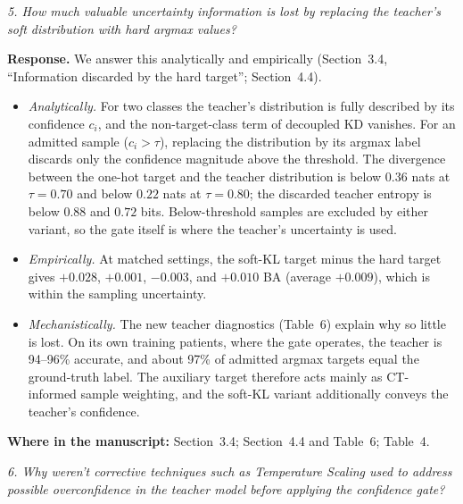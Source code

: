 \documentclass[11pt]{article}
\newenvironment{rcomment}{\par\noindent\begin{minipage}{\linewidth}\itshape\color{black!75}}{\end{minipage}\par}
\newcommand{\where}[1]{\par\noindent\textbf{Where in the manuscript:} #1\par}
\begin{document}
\begin{rcomment}
5. How much valuable uncertainty information is lost by replacing the teacher's soft distribution with hard argmax values?
\end{rcomment}

\textbf{Response.} We answer this analytically and empirically (Section~3.4, ``Information discarded by the hard target''; Section~4.4).
\begin{itemize}[leftmargin=1.4em]
  \item \emph{Analytically.} For two classes the teacher's distribution is fully described by its confidence $c_i$, and the non-target-class term of decoupled KD vanishes. For an admitted sample ($c_i>\tau$), replacing the distribution by its argmax label discards only the confidence magnitude above the threshold. The divergence between the one-hot target and the teacher distribution is below $0.36$ nats at $\tau=0.70$ and below $0.22$ nats at $\tau=0.80$; the discarded teacher entropy is below $0.88$ and $0.72$ bits. Below-threshold samples are excluded by either variant, so the gate itself is where the teacher's uncertainty is used.
  \item \emph{Empirically.} At matched settings, the soft-KL target minus the hard target gives $+0.028$, $+0.001$, $-0.003$, and $+0.010$ BA (average $+0.009$), which is within the sampling uncertainty.
  \item \emph{Mechanistically.} The new teacher diagnostics (Table~6) explain why so little is lost. On its own training patients, where the gate operates, the teacher is 94--96\% accurate, and about 97\% of admitted argmax targets equal the ground-truth label. The auxiliary target therefore acts mainly as CT-informed sample weighting, and the soft-KL variant additionally conveys the teacher's confidence.
\end{itemize}
\where{Section~3.4; Section~4.4 and Table~6; Table~4.}

\begin{rcomment}
6. Why weren't corrective techniques such as Temperature Scaling used to address possible overconfidence in the teacher model before applying the confidence gate?
\end{rcomment}
\end{document}
